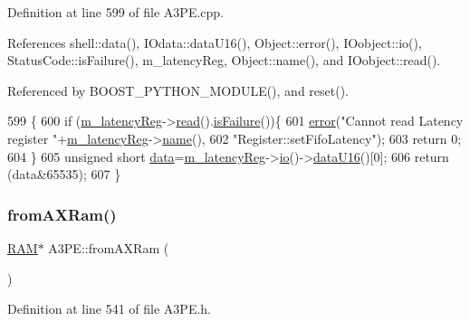 Definition at line 599 of file A3\+P\+E.\+cpp.



References shell\+::data(), I\+Odata\+::data\+U16(), Object\+::error(), I\+Oobject\+::io(), Status\+Code\+::is\+Failure(), m\+\_\+latency\+Reg, Object\+::name(), and I\+Oobject\+::read().



Referenced by B\+O\+O\+S\+T\+\_\+\+P\+Y\+T\+H\+O\+N\+\_\+\+M\+O\+D\+U\+L\+E(), and reset().


\begin{DoxyCode}
599                               \{
600   \textcolor{keywordflow}{if} (\hyperlink{classA3PE_a96a167e73e264da5a18d9ddb5ebb5f23}{m\_latencyReg}->\hyperlink{classIOobject_aa07610c11963b1db6710e3c76ceea456}{read}().\hyperlink{classStatusCode_a5dd22dc6eb2c52fc4cabc58f6dea2eb7}{isFailure}())\{
601     \hyperlink{classObject_a204a95f57818c0f811933917a30eff45}{error}(\textcolor{stringliteral}{"Cannot read Latency register "}+\hyperlink{classA3PE_a96a167e73e264da5a18d9ddb5ebb5f23}{m\_latencyReg}->\hyperlink{classObject_a300f4c05dd468c7bb8b3c968868443c1}{name}(),
602         \textcolor{stringliteral}{"Register::setFifoLatency"});
603     \textcolor{keywordflow}{return} 0;
604   \}
605   \textcolor{keywordtype}{unsigned} \textcolor{keywordtype}{short} \hyperlink{namespaceshell_a5ea2525995cedc3efd69ea8a7f034d1e}{data}=\hyperlink{classA3PE_a96a167e73e264da5a18d9ddb5ebb5f23}{m\_latencyReg}->\hyperlink{classIOobject_af04fb94137c3d86849f478ac5afab5d1}{io}()->\hyperlink{classIOdata_a8d8528b731c6cf117f8c5b9b2473390c}{dataU16}()[0];
606   \textcolor{keywordflow}{return} (data&65535);   
607 \}
\end{DoxyCode}
\mbox{\label{classA3PE_a7c9026a74c1954b2d250be05fbc1c8c5}} 
\subsubsection{\texorpdfstring{from\+A\+X\+Ram()}{fromAXRam()}}
{\footnotesize\ttfamily \hyperlink{classRAM}{R\+AM}$\ast$ A3\+P\+E\+::from\+A\+X\+Ram (\begin{DoxyParamCaption}{ }\end{DoxyParamCaption})\hspace{0.3cm}{\ttfamily [inline]}}



Definition at line 541 of file A3\+P\+E.\+h.



